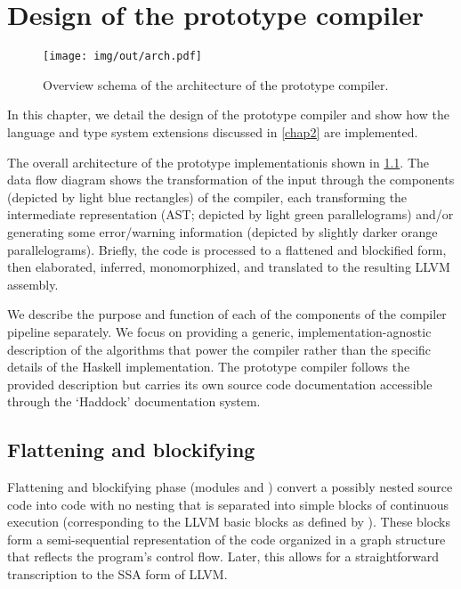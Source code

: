 \chapter{Design of the prototype compiler}

\label{chap3}

\begin{figure}
\caption{Overview schema of the architecture of the prototype compiler.}
\label{fig:arch}
    \texttt{[image: img/out/arch.pdf]}
\end{figure}

In this chapter, we detail the design of the prototype compiler and show how the language and type system extensions discussed in \cref{chap2} are implemented.

The overall architecture of the prototype implementation\cmmrepo is shown in \cref{fig:arch}. The data flow diagram shows the transformation of the input through the components (depicted by light blue rectangles) of the compiler, each transforming the intermediate representation (AST; depicted by light green parallelograms) and/or generating some error/warning information (depicted by slightly darker orange parallelograms). Briefly, the code is processed to a flattened and blockified form, then elaborated, inferred, monomorphized, and translated to the resulting LLVM assembly.

We describe the purpose and function of each of the components of the compiler pipeline separately. We focus on providing a generic, implementation-agnostic description of the algorithms that power the compiler rather than the specific details of the Haskell implementation. The prototype compiler follows the provided description but carries its own source code documentation accessible through the `Haddock' documentation system.

\section{Flattening and blockifying}
\label{sec:flatBlock}

\sloppy Flattening and blockifying phase (modules  and ) convert a possibly nested \cmm source code into code with no nesting that is separated into simple blocks of continuous execution (corresponding to the LLVM basic blocks as defined by \cite{llvmBB}). These blocks form a semi-sequential representation of the code organized in a graph structure that reflects the program's control flow. Later, this allows for a straightforward transcription to the SSA form of LLVM.

